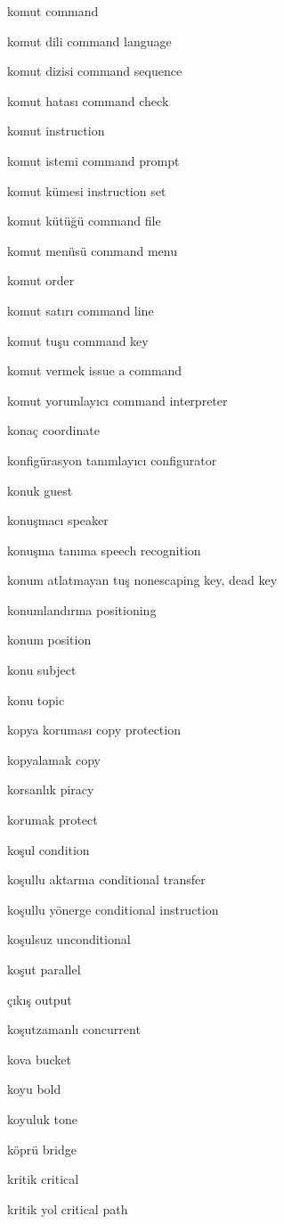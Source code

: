 \documentclass[12pt,fleqn]{article}\usepackage{../../common}
\begin{document}
komut command

komut dili command language

komut dizisi command sequence

komut hatası command check

komut instruction

komut istemi command prompt

komut kümesi instruction set

komut kütüğü command file

komut menüsü command menu

komut order

komut satırı command line

komut tuşu command key

komut vermek issue a command

komut yorumlayıcı command interpreter

konaç coordinate

konfigürasyon tanımlayıcı configurator

konuk guest

konuşmacı speaker

konuşma tanıma speech recognition

konum atlatmayan tuş nonescaping key, dead key

konumlandırma positioning

konum position

konu subject

konu topic

kopya koruması copy protection

kopyalamak copy

korsanlık piracy

korumak protect

koşul condition

koşullu aktarma conditional transfer

koşullu yönerge conditional instruction

koşulsuz unconditional

koşut parallel

çıkış output

koşutzamanlı concurrent

kova bucket

koyu bold

koyuluk tone

köprü bridge

kritik critical

kritik yol critical path
\end{document}
